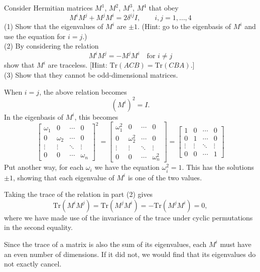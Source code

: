 \documentclass[../principles-of-quantum-mechanics.tex]{subfiles}
\begin{document}
\begin{questions}
\question Consider Hermitian matrices $M^1$, $M^2$, $M^3$, $M^4$ that obey
\[
	M^iM^j + M^jM^i = 2\delta^{ij}I, \qquad i, j = 1, \dots, 4
\]
(1) Show that the eigenvalues of $M^i$ are $\pm{1}$. (Hint: go to the eigenbasis of $M^i$ and use the equation for $i=j$.) \\
(2) By considering the relation
\[
	M^iM^j = -M^jM^i \quad \text{for }i\neq{j}
\]
show that $M^i$ are traceless. [Hint: $\mathrm{Tr}(ACB) = \mathrm{Tr}(CBA)$.] \\
(3) Show that they cannot be odd-dimensional matrices.

\begin{solution}
	When $i=j$, the above relation becomes
	\[
		(M^i)^2 = I.
	\]
	In the eigenbasis of $M^i$, this becomes \\
	\[
		\begin{bmatrix}\omega_1 & 0 & \cdots & 0 \\ 0 & \omega_2 & \cdots & 0 \\ \vdots & \vdots & \ddots & \vdots \\ 0 & 0 & \cdots & \omega_n\end{bmatrix}^2 = \begin{bmatrix}\omega_1^2 & 0 & \cdots & 0 \\ 0 & \omega_2^2 & \cdots & 0 \\ \vdots & \vdots & \ddots & \vdots \\ 0 & 0 & \cdots & \omega_n^2\end{bmatrix} = \begin{bmatrix}1 & 0 & \cdots & 0 \\ 0 & 1 & \cdots & 0 \\ \vdots & \vdots & \ddots & \vdots \\ 0 & 0 & \cdots & 1\end{bmatrix}
	\]
	Put another way, for each $\omega_i$ we have the equation $\omega_i^2 = 1$. This has the solutions $\pm 1$, showing that each eigenvalue of $M^i$ is one of the two values.
	
	Taking the trace of the relation in part (2) gives
	\[
		\mathrm{Tr}(M^iM^j) = \mathrm{Tr}(M^jM^i) = -\mathrm{Tr}(M^jM^i) = 0,
	\]
	where we have made use of the invariance of the trace under cyclic permutations in the second equality.
	
	Since the trace of a matrix is also the sum of its eigenvalues, each $M^i$ must have an even number of dimensions. If it did not, we would find that its eigenvalues do not exactly cancel.
\end{solution}


\end{questions}
\end{document}
